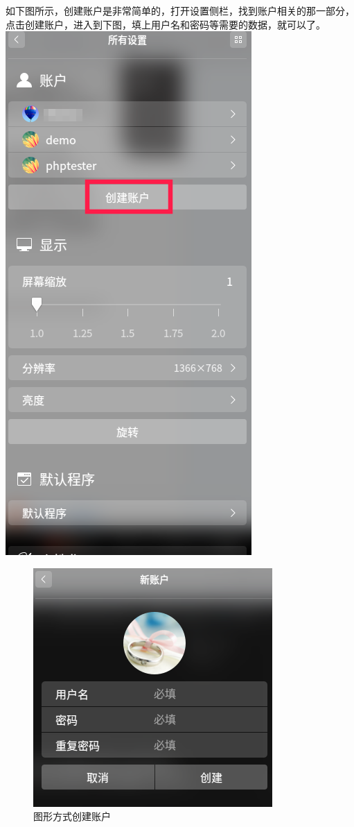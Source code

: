 \documentclass[doctor,openright,twoside]{sjtuthesis}
\theoremstyle{plain}
\theoremstyle{definition}
\theoremstyle{remark}
\theoremstyle{ocrenumbox}
\theoremstyle{plain}
\begin{document}
如下图所示，创建账户是非常简单的，打开设置侧栏，找到账户相关的那一部分，点击创建账户，进入到下图，填上用户名和密码等需要的数据，就可以了。
\includegraphics{images/manager-user-account-01.png}

\begin{figure}
\centering
\includegraphics{images/manager-user-account-02.png}
\caption{图形方式创建账户}
\end{figure}
\end{document}
